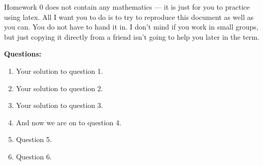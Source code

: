 \documentclass[letterpaper,12pt]{article}
\begin{document}
Homework 0 does not contain any mathematics --- it is just for you to practice using latex. All I want you to do is to try to reproduce this document as well as you can. You do not have to hand it in. I don't mind if you work in small groups, but just copying it directly from a friend isn't going to help you later in the term.


\textbf{Questions:}

\begin{enumerate}
 \item Your solution to question 1.

 \item Your solution to question 2.

 \item Your solution to question 3.

 \item And now we are on to question 4.

\item Question 5.

\item Question 6.
\end{enumerate}

\end{document}
